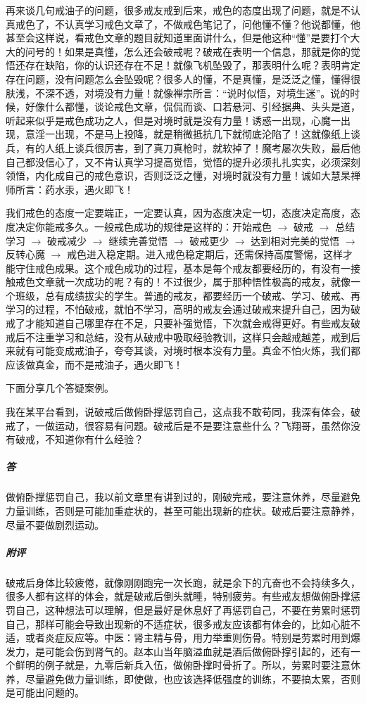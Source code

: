 再来谈几句戒油子的问题，很多戒友戒到后来，戒色的态度出现了问题，就是不认真戒色了，不认真学习戒色文章了，不做戒色笔记了，问他懂不懂？他说都懂，他甚至会这样说，看戒色文章的题目就知道里面讲什么，但是他这种“懂”是要打个大大的问号的！如果是真懂，怎么还会破戒呢？破戒在表明一个信息，那就是你的觉悟还存在缺陷，你的认识还存在不足！就像飞机坠毁了，那表明什么呢？表明肯定存在问题，没有问题怎么会坠毁呢？很多人的懂，不是真懂，是泛泛之懂，懂得很肤浅，不深不透，对境没有力量！就像禅宗所言：“说时似悟，对境生迷”。说的时候，好像什么都懂，谈论戒色文章，侃侃而谈、口若悬河、引经据典、头头是道，听起来似乎是戒色成功之人，但是对境时就是没有力量！诱惑一出现，心魔一出现，意淫一出现，不是马上投降，就是稍微抵抗几下就彻底沦陷了！这就像纸上谈兵，有的人纸上谈兵很厉害，到了真刀真枪时，就软掉了！魔考屡次失败，最后他自己都没信心了，又不肯认真学习提高觉悟，觉悟的提升必须扎扎实实，必须深刻领悟，内化成自己的戒色意识，否则泛泛之懂，对境时就没有力量！诚如大慧杲禅师所言：药水汞，遇火即飞！

我们戒色的态度一定要端正，一定要认真，因为态度决定一切，态度决定高度，态度决定你能戒多久。一般戒色成功的规律是这样的：开始戒色 $\to$ 破戒 $\to$ 总结学习 $\to$ 破戒减少 $\to$ 继续完善觉悟 $\to$ 破戒更少 $\to$ 达到相对完美的觉悟 $\to$ 反转心魔 $\to$ 戒色进入稳定期。进入戒色稳定期后，还需保持高度警惕，这样才能守住戒色成果。这个戒色成功的过程，基本是每个戒友都要经历的，有没有一接触戒色文章就一次成功的呢？有的！不过很少，属于那种悟性极高的戒友，就像一个班级，总有成绩拔尖的学生。普通的戒友，都要经历一个破戒、学习、破戒、再学习的过程，不怕破戒，就怕不学习，高明的戒友会通过破戒来提升自己，因为破戒了才能知道自己哪里存在不足，只要补强觉悟，下次就会戒得更好。有些戒友破戒后不注重学习和总结，没有从破戒中吸取经验教训，这样只会越戒越差，戒到后来就有可能变成戒油子，夸夸其谈，对境时根本没有力量。真金不怕火炼，我们都应该做真金，而不是戒油子，遇火即飞！

下面分享几个答疑案例。

\begin{case}
    我在某平台看到，说破戒后做俯卧撑惩罚自己，这点我不敢苟同，我深有体会，破戒了，一做运动，很容易有问题。破戒后是不是要注意些什么？飞翔哥，虽然你没有破戒，不知道你有什么经验？
    \subparagraph{答} 做俯卧撑惩罚自己，我以前文章里有讲到过的，刚破完戒，要注意休养，尽量避免力量训练，否则是可能加重症状的，甚至可能出现新的症状。破戒后要注意静养，尽量不要做剧烈运动。
    \subparagraph{附评} 破戒后身体比较疲倦，就像刚刚跑完一次长跑，就是余下的亢奋也不会持续多久，很多人都有这样的体会，就是破戒后倒头就睡，特别疲劳。有些戒友想做俯卧撑惩罚自己，这种想法可以理解，但是最好是休息好了再惩罚自己，不要在劳累时惩罚自己，那样可能会导致出现新的不适症状，很多戒友应该都有体会的，比如心脏不适，或者炎症反应等。中医：肾主精与骨，用力举重则伤骨。特别是劳累时用到爆发力，是可能会伤到肾气的。赵本山当年脑溢血就是酒后做俯卧撑引起的，还有一个鲜明的例子就是，九零后新兵入伍，做俯卧撑时骨折了。所以，劳累时要注意休养，尽量避免做力量训练，即使做，也应该选择低强度的训练，不要搞太累，否则是可能出问题的。
\end{case}

